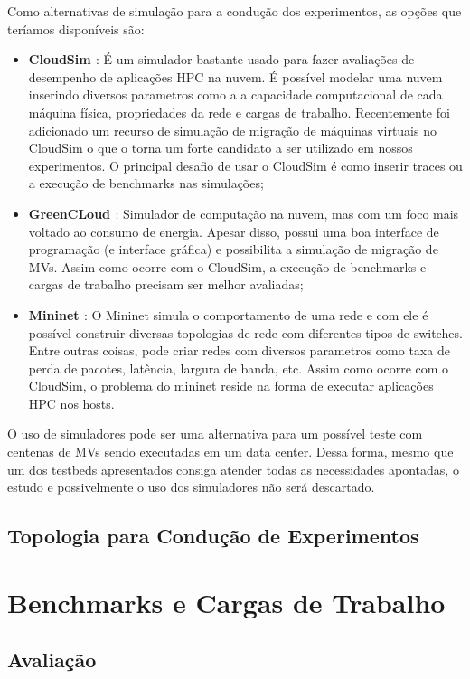 \documentclass[10pt, conference, compsocconf]{IEEEtran}
\begin{document}
Como alternativas de simulação para a condução dos experimentos, as opções que teríamos disponíveis são:
\begin{itemize}
    \item \textbf{CloudSim \cite{Calheiros:2011}}: É um simulador bastante usado para fazer avaliações de desempenho de aplicações HPC na nuvem. É possível modelar uma nuvem inserindo diversos parametros como a a capacidade computacional de cada máquina física, propriedades da rede e cargas de trabalho. Recentemente foi adicionado um recurso de simulação de migração de máquinas virtuais no CloudSim o que o torna um forte candidato a ser utilizado em nossos experimentos. O principal desafio de usar o CloudSim é como inserir traces ou a execução de benchmarks nas simulações; 
    \item \textbf{GreenCLoud \cite{Kliazovich:2010}}: Simulador de computação na nuvem, mas com um foco mais voltado ao consumo de energia. Apesar disso, possui uma boa interface de programação (e interface gráfica) e possibilita a simulação de migração de MVs. Assim como ocorre com o CloudSim, a execução de benchmarks e cargas de trabalho precisam ser melhor avaliadas;
    \item \textbf{Mininet \cite{Handigol:2012}}: O Mininet simula o comportamento de uma rede e com ele é possível construir diversas topologias de rede com diferentes tipos de switches. Entre outras coisas, pode criar redes com diversos parametros como taxa de perda de pacotes, latência, largura de banda, etc. Assim como ocorre com o CloudSim, o problema do mininet reside na forma de executar aplicações HPC nos hosts.
\end{itemize}

O uso de simuladores pode ser uma alternativa para um possível teste com centenas de MVs  sendo executadas em um data center. Dessa forma, mesmo que um dos testbeds apresentados consiga atender todas as necessidades apontadas, o estudo e possivelmente o uso dos simuladores não será descartado.

\subsection{Topologia para Condução de Experimentos}

\section{Benchmarks e Cargas de Trabalho}

\subsection{Avaliação}
\end{document}
